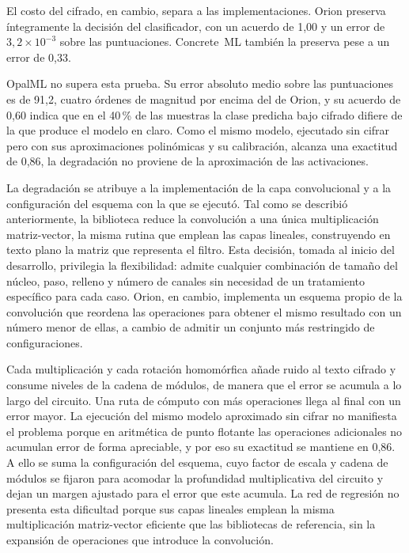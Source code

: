 El costo del cifrado, en cambio, separa a las implementaciones. Orion preserva íntegramente la decisión del clasificador, con un acuerdo de 1,00 y un error de $3{,}2 \times 10^{-3}$ sobre las puntuaciones. Concrete~ML también la preserva pese a un error de 0,33.

OpalML no supera esta prueba. Su error absoluto medio sobre las puntuaciones es de 91,2, cuatro órdenes de magnitud por encima del de Orion, y su acuerdo de 0,60 indica que en el 40\,\% de las muestras la clase predicha bajo cifrado difiere de la que produce el modelo en claro. Como el mismo modelo, ejecutado sin cifrar pero con sus aproximaciones polinómicas y su calibración, alcanza una exactitud de 0,86, la degradación no proviene de la aproximación de las activaciones.

La degradación se atribuye a la implementación de la capa convolucional y a la configuración del esquema con la que se ejecutó. Tal como se describió anteriormente, la biblioteca reduce la convolución a una única multiplicación matriz-vector, la misma rutina que emplean las capas lineales, construyendo en texto plano la matriz que representa el filtro. Esta decisión, tomada al inicio del desarrollo, privilegia la flexibilidad: admite cualquier combinación de tamaño del núcleo, paso, relleno y número de canales sin necesidad de un tratamiento específico para cada caso. Orion, en cambio, implementa un esquema propio de la convolución que reordena las operaciones para obtener el mismo resultado con un número menor de ellas, a cambio de admitir un conjunto más restringido de configuraciones.

Cada multiplicación y cada rotación homomórfica añade ruido al texto cifrado y consume niveles de la cadena de módulos, de manera que el error se acumula a lo largo del circuito. Una ruta de cómputo con más operaciones llega al final con un error mayor. La ejecución del mismo modelo aproximado sin cifrar no manifiesta el problema porque en aritmética de punto flotante las operaciones adicionales no acumulan error de forma apreciable, y por eso su exactitud se mantiene en 0,86. A ello se suma la configuración del esquema, cuyo factor de escala y cadena de módulos se fijaron para acomodar la profundidad multiplicativa del circuito y dejan un margen ajustado para el error que este acumula. La red de regresión no presenta esta dificultad porque sus capas lineales emplean la misma multiplicación matriz-vector eficiente que las bibliotecas de referencia, sin la expansión de operaciones que introduce la convolución.

